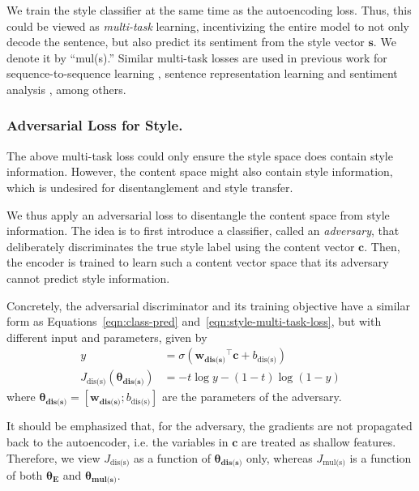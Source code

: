 \documentclass[letterpaper]{article} %
\newcommand{\loss}[1]{J_{\text{#1}}}
\newcommand{\nnweight}[1]{\bm{\theta_{\text{#1}}}}
\newcommand{\weight}[1]{\bm{w_{\text{#1}}}}
\newcommand{\bias}[1]{b_{\text{#1}}}
\begin{document}
We train the style classifier at the same time as the autoencoding loss. Thus, this could be viewed as \textit{multi-task} learning, incentivizing the entire model to not only decode the sentence, but also predict its sentiment from the style vector $\bm  s$. We denote it by ``mul(s).''
Similar multi-task losses are used in previous work for sequence-to-sequence learning \cite{luong2015multi}, sentence representation learning \cite{jernite2017discourse} and sentiment analysis \cite{balikas2017multitask}, among others.


\subsubsection{Adversarial Loss for Style.}
\label{ssec:adversarial-style-objective}

The above multi-task loss could only ensure the style space does contain style information. However, the content space might also contain style information, which is undesired for disentanglement and style transfer.

We thus apply an adversarial loss to disentangle the content space from style information.
The idea is to first introduce a classifier, called an \textit{adversary}, that deliberately discriminates the true style label using the content vector $\bm c$.
Then, the encoder is trained to learn such a content vector space that its adversary cannot predict style information.

Concretely, the adversarial discriminator and its training objective have a similar form as Equations~\ref{eqn:class-pred} and~\ref{eqn:style-multi-task-loss}, but with different input and parameters, given by
\begin{align}
	y                                 & = \sigma({\weight{dis(s)}}^\top \bm c + \bias{dis(s)}) \\
	\label{eqn:adv-disc-loss}
	\loss{dis(s)} (\nnweight{dis(s)}) & =
	- t\log y - (1-t)\log(1-y)
\end{align}
where $\nnweight{dis(s)}=[\weight{dis(s)}; \bias{dis(s)}]$ are the parameters of the adversary.


It should be emphasized that, for the adversary, the gradients are not propagated back to the autoencoder, i.e. the variables in $\bm c$ are treated as shallow features. Therefore, we view $\loss{dis(s)}$ as a function of $\nnweight{dis(s)}$ only, whereas $\loss{mul(s)}$ is a function of both $\nnweight{E}$ and $\nnweight{mul(s)}$.
\end{document}
